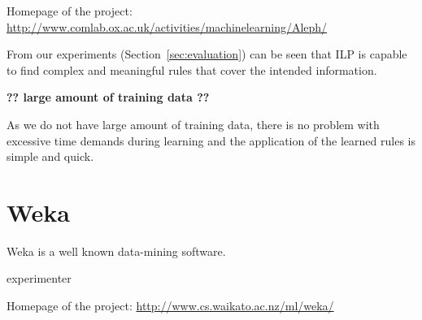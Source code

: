 \medskip
Homepage of the project: \url{http://www.comlab.ox.ac.uk/activities/machinelearning/Aleph/}



From our experiments (Section~\ref{sec:evaluation}) can be seen that ILP is capable to find complex and meaningful rules that cover the intended information.



\textbf{?? large amount of training data ??}

As we do not have large amount of training data, there is no problem with excessive time demands during learning and the application of the learned rules is simple and quick.



\section{Weka}

Weka \citep{biblio:Weka} is a well known data-mining software.

experimenter

\medskip
Homepage of the project: \url{http://www.cs.waikato.ac.nz/ml/weka/}

